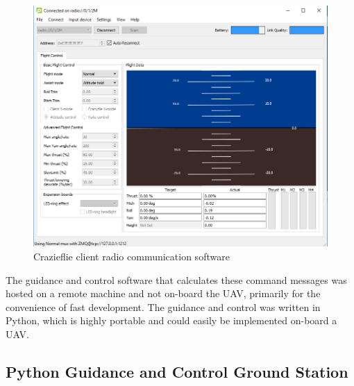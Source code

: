\documentclass[numbered,pdftex]{ohio-etd}
\begin{document}
\begin{figure}[H]
	\centering
	\includegraphics[trim=0 0 0 0,clip,width=12cm]{PaperFigures/Methods/cfClient}
	\caption{Crazieflie client radio communication software}
	\label{fig:cfClient}
\end{figure}

The guidance and control software that calculates these command messages was hosted on a remote machine and not on-board the UAV, primarily for the convenience of fast development. The guidance and control was written in Python, which is highly portable and could easily be implemented on-board a UAV. 

%
%
%



\subsection{Python Guidance and Control Ground Station}
\end{document}
